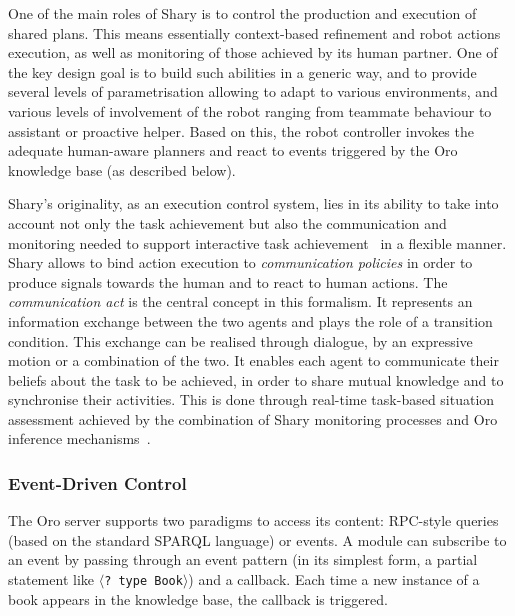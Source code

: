 \documentclass[preprint,3p,times]{elsarticle}
\newcommand{\stmt}[1]{{\footnotesize\tt$\langle$#1\relax$\rangle$}}
\begin{document}
One of the main roles of {\sc Shary} is to control the production and execution
of shared plans. This means essentially context-based refinement and robot
actions execution, as well as monitoring of those achieved by its human
partner. One of the key design goal is to build such abilities in a generic
way, and to provide several levels of parametrisation allowing to adapt to
various environments, and various levels of involvement of the robot ranging
from teammate behaviour to assistant or proactive helper. Based on this,
the robot controller invokes the adequate human-aware planners and react to
events triggered by the {\sc Oro} knowledge base (as described below).

{\sc Shary}'s originality, as an execution control system, lies in its ability
to take into account not only the task achievement but also the communication
and monitoring needed to support interactive task
achievement~\cite{Rich1997,Sidner2005} in a flexible manner. {\sc Shary} allows
to bind action execution to \emph{communication policies} in order to produce
signals towards the human and to react to human actions. The
\emph{communication act} is the central concept in this formalism. It
represents an information exchange between the two agents and plays the role of
a transition condition. This exchange can be realised through dialogue, by an
expressive motion or a combination of the two. It enables each agent to
communicate their beliefs about the task to be achieved, in order to share
mutual knowledge and to synchronise their activities.  This is done through
real-time task-based situation assessment achieved by the combination of {\sc
Shary} monitoring processes and {\sc Oro} inference
mechanisms~\cite{fiore2014}. 



\subsubsection{Event-Driven Control}
\label{events}

The {\sc Oro} server supports two paradigms to access its content: RPC-style
queries (based on the standard SPARQL language) or events. A module can
subscribe to an event by passing through an event pattern (in its simplest
form, a partial statement like \stmt{? type Book}) and a callback.  Each
time a new instance of a book appears in the knowledge base, the callback is
triggered.
\end{document}
